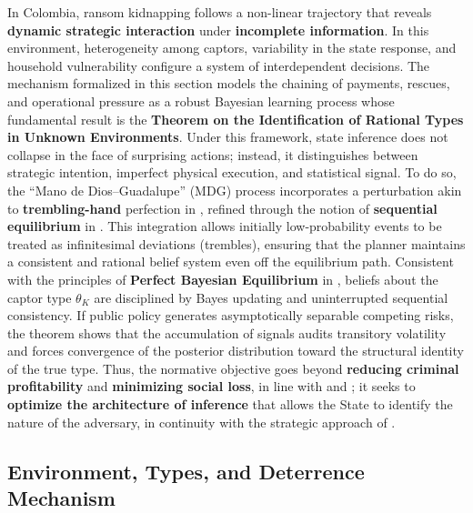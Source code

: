 \documentclass[12pt,a4paper]{article}
\providecommand{\textcite}{\citet}
\theoremstyle{plain}
\theoremstyle{definition}
\theoremstyle{remark}
\newcommand{\1}{\mathbf{1}}
\begin{document}
\noindent In Colombia, ransom kidnapping follows a non-linear trajectory that reveals
\textbf{dynamic strategic interaction} under \textbf{incomplete information}. In this
environment, heterogeneity among captors, variability in the state response, and
household vulnerability configure a system of interdependent decisions. The mechanism
formalized in this section models the chaining of payments, rescues, and operational
pressure as a robust Bayesian learning process whose fundamental result is the
\textbf{Theorem on the Identification of Rational Types in Unknown Environments}. Under
this framework, state inference does not collapse in the face of surprising actions;
instead, it distinguishes between strategic intention, imperfect physical execution,
and statistical signal. To do so, the ``Mano de Dios--Guadalupe'' (MDG) process
incorporates a perturbation akin to \textbf{trembling-hand} perfection in
\textcite{Selten1975Perfectness}, refined through the notion of \textbf{sequential
equilibrium} in \textcite{KrepsWilson1982}. This integration allows initially
low-probability events to be treated as infinitesimal deviations (trembles), ensuring
that the planner maintains a consistent and rational belief system even off the
equilibrium path. Consistent with the principles of \textbf{Perfect Bayesian
Equilibrium} in \textcite{FudenbergTirole1991}, beliefs about the captor type
$\theta_K$ are disciplined by Bayes updating and uninterrupted sequential consistency.
If public policy generates asymptotically separable competing risks, the theorem shows
that the accumulation of signals audits transitory volatility and forces convergence of
the posterior distribution toward the structural identity of the true type. Thus, the
normative objective goes beyond \textbf{reducing criminal profitability} and
\textbf{minimizing social loss}, in line with \textcite{Becker1968} and
\textcite{Mejia2000Secuestro}; it seeks to \textbf{optimize the architecture of
inference} that allows the State to identify the nature of the adversary, in continuity
with the strategic approach of \textcite{Selten1977Kidnapping}.

\label{sec:formal-mecanismo}
\label{sec:forma-juego}
\label{sec:types}

\subsection{Environment, Types, and Deterrence Mechanism}
\label{subsec:acciones}
\end{document}
